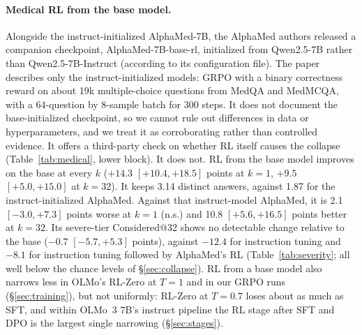 \documentclass[11pt]{article}
\begin{document}
\paragraph{Medical RL from the base model.}
Alongside the instruct-initialized AlphaMed-7B, the AlphaMed authors released a companion checkpoint, AlphaMed-7B-base-rl, initialized from Qwen2.5-7B rather than Qwen2.5-7B-Instruct (according to its configuration file). The paper~\citep{liu2025alphamed} describes only the instruct-initialized models: GRPO with a binary correctness reward on about 19k multiple-choice questions from MedQA and MedMCQA, with a 64-question by 8-sample batch for 300 steps. It does not document the base-initialized checkpoint, so we cannot rule out differences in data or hyperparameters, and we treat it as corroborating rather than controlled evidence.
It offers a third-party check on whether RL itself causes the collapse (Table~\ref{tab:medical}, lower block).
It does not. RL from the base model improves on the base at every $k$ ($+14.3$ $[+10.4,+18.5]$ points at $k{=}1$, $+9.5$ $[+5.0,+15.0]$ at $k{=}32$). It keeps 3.14 distinct answers, against 1.87 for the instruct-initialized AlphaMed.
Against that instruct-model AlphaMed, it is 2.1 $[-3.0,+7.3]$ points worse at $k{=}1$ (n.s.) and 10.8 $[+5.6,+16.5]$ points better at $k{=}32$.
Its severe-tier Considered@32 shows no detectable change relative to the base ($-0.7$ $[-5.7,+5.3]$ points), against $-12.4$ for instruction tuning and $-8.1$ for instruction tuning followed by AlphaMed's RL (Table~\ref{tab:severity}; all well below the chance levels of \S\ref{sec:collapse}).
RL from a base model also narrows less in OLMo's RL-Zero at $T{=}1$ and in our GRPO runs (\S\ref{sec:training}), but not uniformly: RL-Zero at $T{=}0.7$ loses about as much as SFT, and within OLMo~3 7B's instruct pipeline the RL stage after SFT and DPO is the largest single narrowing (\S\ref{sec:stages}).
\end{document}
